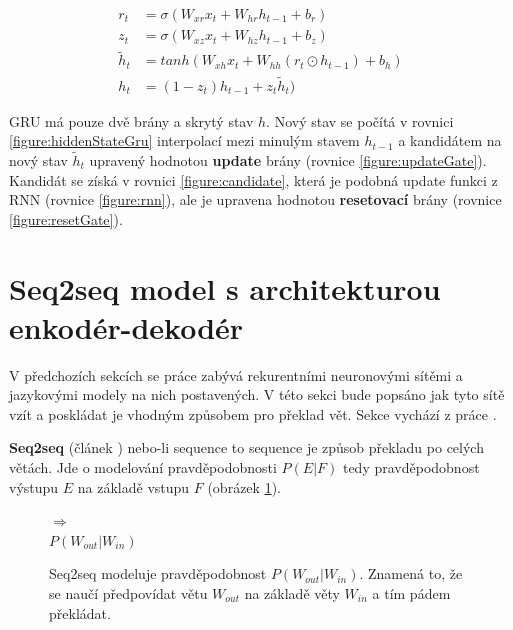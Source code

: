 \begin{align}
    r_{t}&=\sigma(W_{xr}x_{t}+W_{hr}h_{t-1}+b_{r}) \label{figure:resetGate} \\
    z_{t}&=\sigma(W_{xz}x_{t}+W_{hz}h_{t-1}+b_{z}) \label{figure:updateGate} \\
    \tilde{h}_{t}&=tanh(W_{xh}x_t + W_{hh}(r_t \odot h_{t-1}) + b_h) \label{figure:candidate} \\
    h_{t}&=(1 - z_t)h_{t-1} + z_{t}\tilde{h}_{t}) \label{figure:hiddenStateGru}
\end{align}

GRU má pouze dvě brány a skrytý stav $h$. Nový stav se počítá v rovnici \ref{figure:hiddenStateGru} interpolací mezi minulým stavem $h_{t-1}$ a kandidátem na nový stav $\tilde{h}_{t}$ upravený hodnotou \textbf{update} brány (rovnice \ref{figure:updateGate}). Kandidát se získá v rovnici \ref{figure:candidate}, která je podobná update funkci z RNN (rovnice \ref{figure:rnn}), ale je upravena hodnotou \textbf{resetovací} brány (rovnice \ref{figure:resetGate}).



\section{Seq2seq model s architekturou enkodér-dekodér}
V předchozích sekcích se práce zabývá rekurentními neuronovými sítěmi a jazykovými modely na nich postavených. V této sekci bude popsáno jak tyto sítě vzít a poskládat je vhodným způsobem pro překlad vět. Sekce vychází z práce \cite{nmtTutorial}.

\textbf{Seq2seq} (článek \cite{seq2seq}) nebo-li sequence to sequence je způsob překladu po celých větách. Jde o modelování pravděpodobnosti $P(E|F)$ tedy pravděpodobnost výstupu $E$ na základě vstupu $F$ (obrázek \ref{figure:seqProbability}).

\begin{figure}[H]
    \begin{center}
        \setlength{\fboxsep}{8pt}
        $\Longrightarrow$
        \\ \vspace{5mm}
        $P(W_{out}|W_{in})$
    \end{center}
	\caption{Seq2seq modeluje pravděpodobnost $P(W_{out}|W_{in})$. Znamená to, že se naučí předpovídat větu $W_{out}$ na základě věty $W_{in}$ a tím pádem překládat.}
	\label{figure:seqProbability}
\end{figure}

